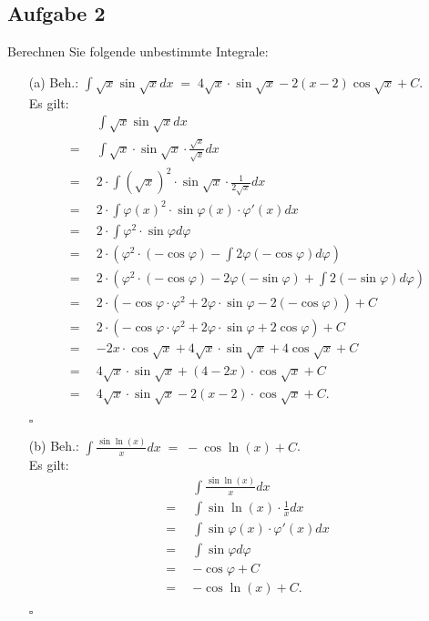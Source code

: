 \documentclass[12pt]{article}
\newcommand{\QED}{\begin{flushright} $\square$ \end{flushright}}
\begin{document}
\subsection*{Aufgabe 2}
Berechnen Sie folgende unbestimmte Integrale:
\begin{enumerate}
	\item[(a)] Beh.: ${\displaystyle \int \sqrt{x}\sin\sqrt{x} dx \; = \; 4\sqrt{x} \cdot \sin\sqrt{x} - 2(x-2)\cos\sqrt{x} + C }$. \\
	Es gilt:
	\begin{align*}
		&\int \sqrt{x}\sin\sqrt{x} dx \\
		= \enspace &\int \sqrt{x} \cdot \sin\sqrt{x} \cdot \frac{\sqrt{x}}{\sqrt{x}} dx \\
		= \enspace &2 \cdot \int (\sqrt{x})^2 \cdot \sin\sqrt{x} \cdot \frac{1}{2\sqrt{x}} dx \\
		= \enspace &2 \cdot \int \varphi(x)^2 \cdot \sin\varphi(x) \cdot \varphi'(x) dx \\
		= \enspace &2 \cdot \int \varphi^2 \cdot \sin\varphi d\varphi \\
		= \enspace &2 \cdot \left( \varphi^2 \cdot (-\cos\varphi) - \int 2\varphi(-\cos\varphi) d\varphi \right) \\
		= \enspace &2 \cdot \left(\varphi^2 \cdot (-\cos\varphi) - 2\varphi(-\sin\varphi) + \int 2(-\sin\varphi) d\varphi\right) \\
		= \enspace &2 \cdot \left(-\cos\varphi \cdot \varphi^2 + 2\varphi \cdot \sin\varphi - 2(-\cos\varphi) \right) + C \\
		= \enspace &2 \cdot \left(-\cos\varphi \cdot \varphi^2 + 2\varphi \cdot \sin\varphi + 2\cos\varphi\right) + C \\
		= \enspace &-2x \cdot \cos\sqrt{x} + 4\sqrt{x}\cdot\sin\sqrt{x} + 4\cos\sqrt{x} + C \\
		= \enspace &4\sqrt{x}\cdot\sin\sqrt{x} + (4-2x) \cdot \cos\sqrt{x} + C \\
		= \enspace &4\sqrt{x}\cdot\sin\sqrt{x} - 2(x-2) \cdot \cos\sqrt{x} + C.
	\end{align*}
	\QED
	
	\item[(b)] Beh.: ${\displaystyle \int \frac{\sin\ln(x)}{x} dx \; = \; -\cos\ln(x) + C }$. \\
	Es gilt:
	\begin{align*}
		&\int \frac{\sin\ln(x)}{x} dx \\
		= \enspace &\int \sin\ln(x) \cdot \frac{1}{x} dx \\
		= \enspace &\int \sin\varphi(x) \cdot \varphi'(x) dx \\
		= \enspace &\int \sin\varphi d\varphi \\
		= \enspace &-\cos\varphi + C \\
		= \enspace &-\cos\ln(x) + C.
	\end{align*}
	\QED
	

\end{enumerate}
\end{document}
